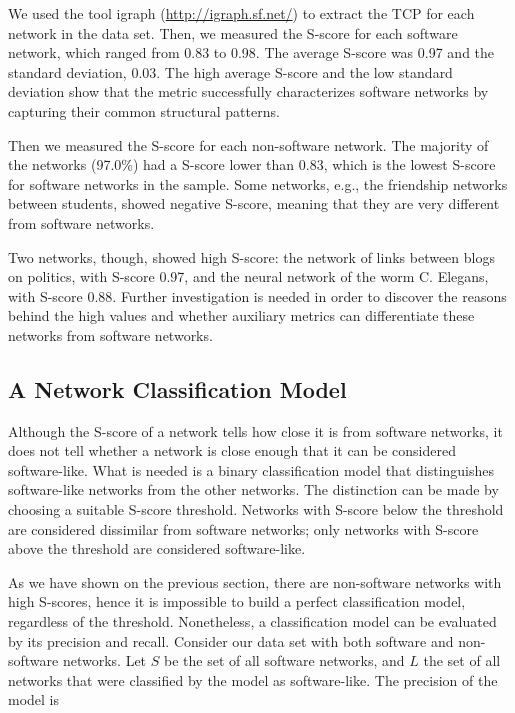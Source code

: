We used the tool igraph (\url{http://igraph.sf.net/}) to extract the TCP for
each network in the data set. Then, we measured the S-score for each software
network, which ranged from 0.83 to 0.98. The average S-score was 0.97 and the
standard deviation, 0.03. The high average S-score and the low standard
deviation show that the metric successfully characterizes software networks by
capturing their common structural patterns.

Then we measured the S-score for each non-software network. The majority of the
networks (97.0\%) had a S-score lower than 0.83, which is the lowest S-score
for software networks in the sample. Some networks, e.g., the friendship
networks between students, showed negative S-score, meaning that they are very
different from software networks.

Two networks, though, showed high S-score: the network of links between blogs
on politics, with S-score 0.97, and the neural network of the worm C. Elegans,
with S-score 0.88. Further investigation is needed in order to discover the
reasons behind the high values and whether auxiliary metrics can differentiate
these networks from software networks.

\subsection{A Network Classification Model} \label{sec:classmodel}
Although the S-score of a network tells how close it is from software networks,
it does not tell whether a network is close enough that it can be considered
software-like. What is needed is a binary classification model that
distinguishes software-like networks from the other networks. The distinction
can be made by choosing a suitable S-score threshold. Networks with S-score
below the threshold are considered dissimilar from software networks; only
networks with S-score above the threshold are considered software-like. 

As we have shown on the previous section, there are non-software networks with
high S-scores, hence it is impossible to build a perfect classification model,
regardless of the threshold. Nonetheless, a classification model can be
evaluated by its precision and recall. Consider our data set with both software
and non-software networks. Let $S$ be the set of all software networks, and $L$
the set of all networks that were classified by the model as software-like. The
precision of the model is

